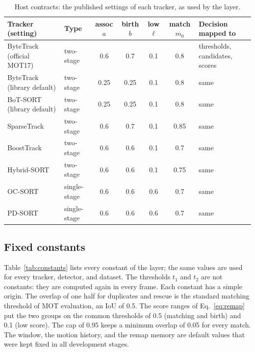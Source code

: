 \documentclass[pdflatex,sn-mathphys-num,iicol]{sn-jnl}
\begin{document}
\begin{table}[t]
\caption{Host contracts: the published settings of each tracker, as used by
the layer.}
\label{tab:contracts}
\centering\footnotesize
\setlength{\tabcolsep}{4pt}
\begin{tabular}{@{}>{\raggedright\arraybackslash}p{30mm}lcccc>{\raggedright\arraybackslash}p{32mm}@{}}
\toprule
Tracker (setting) & Type & assoc $a$ & birth $b$ & low $\ell$ & match $m_0$ & Decision mapped to\\
\midrule
ByteTrack (official MOT17) & two-stage & 0.6 & 0.7 & 0.1 & 0.8 & thresholds, candidates, scores\\
ByteTrack (library default) & two-stage & 0.25 & 0.25 & 0.1 & 0.8 & same\\
BoT-SORT (library default) & two-stage & 0.25 & 0.25 & 0.1 & 0.8 & same\\
SparseTrack & two-stage & 0.6 & 0.7 & 0.1 & 0.85 & same\\
BoostTrack & two-stage & 0.6 & 0.6 & 0.1 & 0.7 & same\\
Hybrid-SORT & two-stage & 0.6 & 0.6 & 0.1 & 0.75 & same\\
OC-SORT & single-stage & 0.6 & 0.6 & 0.6 & 0.7 & same\\
PD-SORT & single-stage & 0.6 & 0.6 & 0.6 & 0.7 & same\\
\bottomrule
\end{tabular}
\end{table}

\subsection{Fixed constants}\label{sec:constants}
Table~\ref{tab:constants} lists every constant of the layer; the same values
are used for every tracker, detector, and dataset. The thresholds $t_1$ and
$t_2$ are not constants: they are computed again in every frame. Each
constant has a simple origin. The overlap of one half for duplicates and
rescue is the standard matching threshold of MOT evaluation, an IoU of 0.5. The score ranges of Eq.~\eqref{eq:remap} put the two
groups on the common thresholds of 0.5 (matching and birth) and 0.1 (low
score). The cap of 0.95 keeps a minimum overlap of 0.05 for every match. The
window, the motion history, and the remap memory are default values that were
kept fixed in all development stages.
\end{document}
